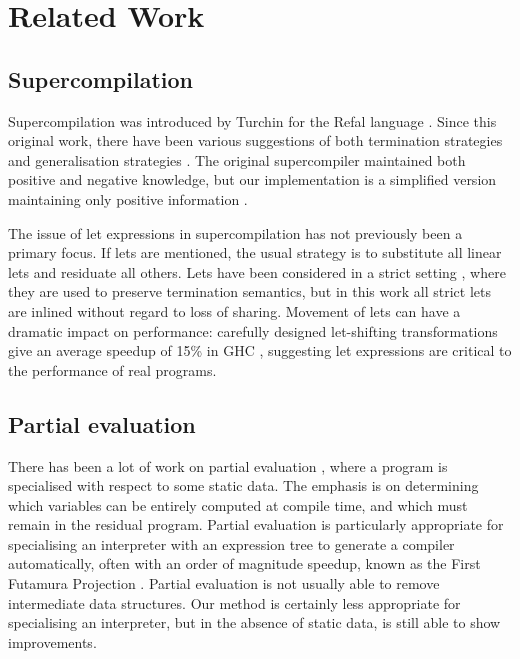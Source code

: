\section{Related Work}
\label{secS:related}

\subsection{Supercompilation}

Supercompilation \cite{supercompilation,turchin:experiments} was introduced by Turchin for the Refal language \cite{refal}. Since this original work, there have been various suggestions of both termination strategies and generalisation strategies \cite{turchin:generalisation,sorensen:supercompilation,leuschel:homeomorphic}. The original supercompiler maintained both positive and negative knowledge, but our implementation is a simplified version maintaining only positive information \cite{secher:perfect_supercompilation}.

The issue of let expressions in supercompilation has not previously been a primary focus. If lets are mentioned, the usual strategy is to substitute all linear lets and residuate all others. Lets have been considered in a strict setting \cite{jonsson:supercompilation}, where they are used to preserve termination semantics, but in this work all strict lets are inlined without regard to loss of sharing. Movement of lets can have a dramatic impact on performance: carefully designed let-shifting transformations give an average speedup of 15\% in GHC \cite{spj:letfloating}, suggesting let expressions are critical to the performance of real programs.

\subsection{Partial evaluation}

There has been a lot of work on partial evaluation \cite{jones:partial_evaluation}, where a program is specialised with respect to some static data. The emphasis is on determining which variables can be entirely computed at compile time, and which must remain in the residual program. Partial evaluation is particularly appropriate for specialising an interpreter with an expression tree to generate a compiler automatically, often with an order of magnitude speedup, known as the First Futamura Projection \cite{futanama:projections}. Partial evaluation is not usually able to remove intermediate data structures. Our method is certainly less appropriate for specialising an interpreter, but in the absence of static data, is still able to show improvements.

